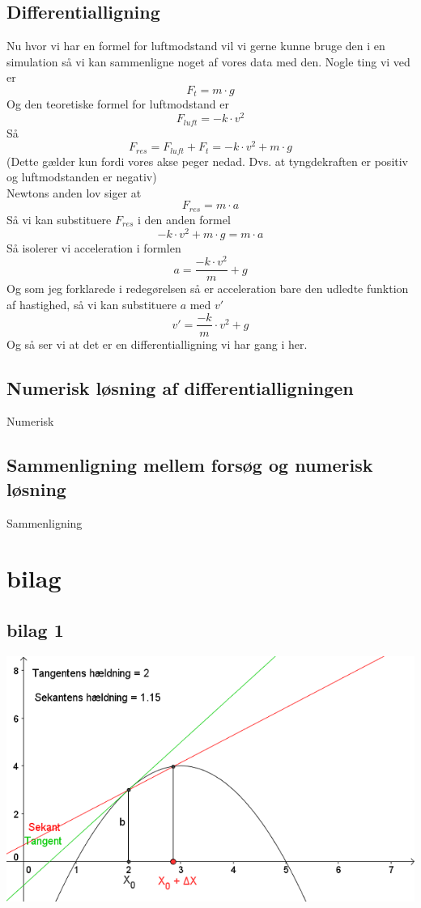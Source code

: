\documentclass[12pt]{article}
\begin{document}
\subsection{Differentialligning}
Nu hvor vi har en formel for luftmodstand vil vi gerne kunne bruge den i en simulation så vi kan sammenligne noget af vores data med den.
Nogle ting vi ved er
$$F_{t}=m \cdot g$$
Og den teoretiske formel for luftmodstand er
$$F_{luft}=-k \cdot v^2$$
Så
$$F_{res}=F_{luft}+F_{t}=-k \cdot v^2 + m \cdot g$$
(Dette gælder kun fordi vores akse peger nedad. Dvs. at tyngdekraften er positiv og luftmodstanden er negativ)\\
Newtons anden lov siger at
$$F_{res}=m \cdot a$$
Så vi kan substituere $F_{res}$ i den anden formel
$$-k \cdot v^2 + m \cdot g = m \cdot a$$
Så isolerer vi acceleration i formlen
$$a = \frac{-k \cdot v^2}{m} + g$$
Og som jeg forklarede i redegørelsen så er acceleration bare den udledte funktion af hastighed, så vi kan substituere
$a$ med $v'$
$$v'=\frac{-k}{m}\cdot v^2 + g$$
Og så ser vi at det er en differentialligning vi har gang i her.

\subsection{Numerisk løsning af differentialligningen}
Numerisk

\subsection{Sammenligning mellem forsøg og numerisk løsning}
Sammenligning

\section{bilag}
\subsection*{bilag 1}
\begin{center}
  \includegraphics[width=\linewidth]{tangentogsekant.png}
\end{center}
\end{document}

